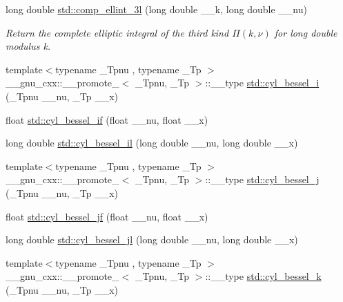 \begin{DoxyCompactItemize}
long double \hyperlink{group__tr29124__math__spec__func_ga1ca081fee102cd0d4d6b091285e495e5}{std\+::comp\+\_\+ellint\+\_\+3l} (long double \+\_\+\+\_\+k, long double \+\_\+\+\_\+nu)
\begin{DoxyCompactList}\small\item\em Return the complete elliptic integral of the third kind $ \Pi(k,\nu) $ for {\ttfamily long double} modulus {\ttfamily k}. \end{DoxyCompactList}\item 
{\footnotesize template$<$typename \+\_\+\+Tpnu , typename \+\_\+\+Tp $>$ }\\\+\_\+\+\_\+gnu\+\_\+cxx\+::\+\_\+\+\_\+promote\+\_$<$ \+\_\+\+Tpnu, \+\_\+\+Tp $>$\+::\+\_\+\+\_\+type \hyperlink{group__tr29124__math__spec__func_ga1c9b5a5c36f000a4f0a55f7fcc486cb0}{std\+::cyl\+\_\+bessel\+\_\+i} (\+\_\+\+Tpnu \+\_\+\+\_\+nu, \+\_\+\+Tp \+\_\+\+\_\+x)
\item 
float \hyperlink{group__tr29124__math__spec__func_gaaf738427d4da0bda66bc2274dfb853a7}{std\+::cyl\+\_\+bessel\+\_\+if} (float \+\_\+\+\_\+nu, float \+\_\+\+\_\+x)
\item 
long double \hyperlink{group__tr29124__math__spec__func_gab7962629216d03efb8ecaa3f70c6878f}{std\+::cyl\+\_\+bessel\+\_\+il} (long double \+\_\+\+\_\+nu, long double \+\_\+\+\_\+x)
\item 
{\footnotesize template$<$typename \+\_\+\+Tpnu , typename \+\_\+\+Tp $>$ }\\\+\_\+\+\_\+gnu\+\_\+cxx\+::\+\_\+\+\_\+promote\+\_$<$ \+\_\+\+Tpnu, \+\_\+\+Tp $>$\+::\+\_\+\+\_\+type \hyperlink{group__tr29124__math__spec__func_ga47e21a13b6d68d0d7f057699bd3b3ce0}{std\+::cyl\+\_\+bessel\+\_\+j} (\+\_\+\+Tpnu \+\_\+\+\_\+nu, \+\_\+\+Tp \+\_\+\+\_\+x)
\item 
float \hyperlink{group__tr29124__math__spec__func_ga15731a7bccd6351d28353e3c4c2a2d23}{std\+::cyl\+\_\+bessel\+\_\+jf} (float \+\_\+\+\_\+nu, float \+\_\+\+\_\+x)
\item 
long double \hyperlink{group__tr29124__math__spec__func_gade8e94a80520a8b628b2d658755b25c0}{std\+::cyl\+\_\+bessel\+\_\+jl} (long double \+\_\+\+\_\+nu, long double \+\_\+\+\_\+x)
\item 
{\footnotesize template$<$typename \+\_\+\+Tpnu , typename \+\_\+\+Tp $>$ }\\\+\_\+\+\_\+gnu\+\_\+cxx\+::\+\_\+\+\_\+promote\+\_$<$ \+\_\+\+Tpnu, \+\_\+\+Tp $>$\+::\+\_\+\+\_\+type \hyperlink{group__tr29124__math__spec__func_ga76dcd3884620955680112aca0d327ada}{std\+::cyl\+\_\+bessel\+\_\+k} (\+\_\+\+Tpnu \+\_\+\+\_\+nu, \+\_\+\+Tp \+\_\+\+\_\+x)

\end{DoxyCompactItemize}
